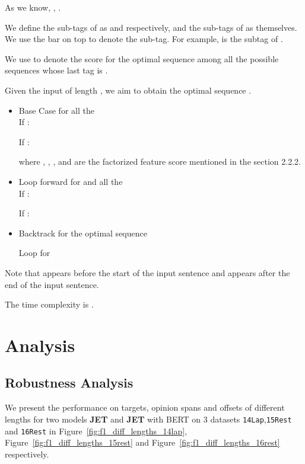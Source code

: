 \documentclass[11pt,a4paper]{article}
\begin{document}
As we know, , .

 

We define the sub-tags of  as  and  respectively, and the sub-tags of  as themselves.
We use the bar on top to denote the sub-tag.
For example,  is the subtag of .





We use  to denote the score for the optimal sequence  among all the possible sequences whose last tag is .

Given the input  of length , we aim to obtain the optimal sequence . \\
\begin{itemize}
    \item Base Case for all the  \\
If :
    
    
    If :
    \setlength{\abovedisplayskip}{4pt} \setlength{\abovedisplayshortskip}{4pt}
    \setlength{\belowdisplayskip}{4pt} \setlength{\belowdisplayshortskip}{4pt}
    
where  , , , and  are the factorized feature score  mentioned in the section 2.2.2.
    \item Loop forward for  and all the  \\
    If :
    \setlength{\abovedisplayskip}{4pt} \setlength{\abovedisplayshortskip}{4pt}
    \setlength{\belowdisplayskip}{4pt} \setlength{\belowdisplayshortskip}{4pt}
    
    If :
    \setlength{\abovedisplayskip}{4pt} \setlength{\abovedisplayshortskip}{4pt}
    \setlength{\belowdisplayskip}{4pt} \setlength{\belowdisplayshortskip}{4pt}
    
    \item Backtrack for the optimal sequence  \\
    \setlength{\abovedisplayskip}{4pt} \setlength{\abovedisplayshortskip}{4pt}
    \setlength{\belowdisplayskip}{4pt} \setlength{\belowdisplayshortskip}{4pt}
    
    Loop for  
    
\end{itemize}
Note that  appears before the start of the input sentence and  appears after the end of the input sentence.

The time complexity is .


\section{Analysis}
\subsection{Robustness Analysis}
We present the performance on targets, opinion spans and offsets of different lengths for two models \textbf{JET} and \textbf{JET} with BERT on 3 datasets {\texttt{14Lap}},{\texttt{15Rest}} and {\texttt{16Rest}} in Figure~\ref{fig:f1_diff_lengths_14lap}, Figure~\ref{fig:f1_diff_lengths_15rest} and Figure~\ref{fig:f1_diff_lengths_16rest} respectively.
\end{document}
